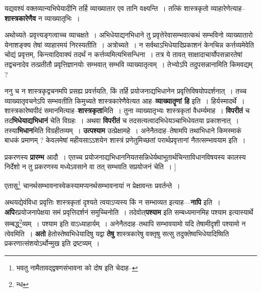 \documentclass[article,12pt,a4paper]{memoir}
\begin{document}
	  \pstart यद्यवश्यं वक्तव्यान्यभिघेयादीनि तर्हि व्याख्यातार एव तानि वक्ष्यन्ति । तत्किं शास्त्रकृतो व्याहारेणेत्याह--\textbf{शास्त्रकारेणैव} न व्याख्यातृभिः ।
	\pend
      

	  \pstart अथोच्यते--प्रवृत्त्यङ्गत्वाच्च व्याचक्षते । अभिधेयाद्यनभिधाने तु प्रवृत्तेरेवासम्भवात्कथं सम्भविनो व्याख्यातारो येनाशङ्क्य तेषां व्याहारमयं निरस्यतीति । अत्रोच्यते । न सर्वथाऽभिधेयादिप्रकाशनं केनचिन्न कर्त्तव्यमेवेति चोद्यं प्रवृत्तम्, किन्त्वादिवाक्यं तदर्थं न कर्त्तव्यमित्यभिसन्धिना । तत्र ये तावत् साक्षादाचार्योपसन्नारतेषां तद्वचनादेव तत्प्रतीतौ प्रवृत्तिज्ञानयोः सम्भवात् सम्भवि व्याख्यातृत्वम् । तेभ्योऽपि तदुपसन्नानामिति किमवद्यम् ?
	\pend
      

	  \pstart ननु च न शास्त्रकृद्वचनमपि प्रसह्य प्रवर्त्तयति, किं तर्हि प्रयोजनाद्यभिधानेन प्रवृत्तिविषयोपदर्शनात् । तच्च व्याख्यातृवचनेऽपि सम्भवतीति किमुच्यते शास्त्रकारेणैवेत्यत आह--\textbf{व्याख्यातॄणां हि} इति । हिर्यस्मादर्थे । शास्त्रकारेष्वपीदं समानमित्याह--\textbf{शास्त्रकृता}मिति । तुना व्याख्यातृभ्यः शास्त्रकृतां वैधर्म्यमाह । \textbf{विपरीतं} च तद\textbf{भिधेयाद्यभिधानं} चेति विग्रहः । अथवा \textbf{विपरीतं} च तदसत्यत्वादभिधेयञ्चाभिधेयतया प्रकाशनात् । तस्या\textbf{भिधान}मिति विग्रहीतव्यम् । \textbf{उत्पश्याम} उत्प्रेक्षामहे । अनेनैतदाह--तेषामपि तथाभिधाने किमस्माकं बाधकं प्रमाणम् ? केवलमेषां महीयसाऽऽशयेन शास्त्रं प्रणेतुमिच्छतां परार्थप्रवृत्तानां नैतत्सम्भावयाम इति ।
	\pend
      

	  \pstart प्रकरणस्य \textbf{प्रारम्भ} आदौ । एतच्च प्रयोजनाद्यभिधाननियतसन्निधेर्यथाभूतार्थचिन्ताविधानविषयस्य कालस्य निर्देशो न तु प्रकरणस्य \leavevmode{} मध्येऽवसाने वा तत् सम्भवति सप्रयोजनं चेति ।
	\pend
      [[उपायोऽस्ति प्रयो० C]]
	  \bigskip
	  \begingroup
	

	  \pstart एतासु\footnote{भवतु नामैतावद्द्वषणसंभावना को दोष इति चेदाह--\cite{dp-msD-n}} चानर्थसम्भावनास्वेकस्यामप्यनर्थसम्भावनायां न प्रेक्षावन्तः प्रवर्तन्ते ।
	\pend
      
	  \endgroup
	

	  \pstart अथयद्येवंविधा प्रवृत्तिः शास्त्रकृतां दृश्यते त्वयाऽप्यस्य किं न सम्भाव्यत इत्याह—\textbf{नापि} इति । \textbf{अपि}रप्रयोजनापेक्षया समं प्रवृत्तिदर्शनं समुच्चिनोति । तदेवोत्\textbf{पश्याम} इति सम्बध्यमानमिह पश्याम इत्यास्यार्थे सम्बद्ध\footnote{न्ध}\-व्यम् । पश्याम इति वाऽध्याहार्यम् । अनेनैतदाह--तथापि सम्भावयामो यदि तेषामीदृशी पश्यामो न त्वेवमिति । \textbf{अतो} हेतोस्तेष्वभिधेयादिषु यद्वा \textbf{तेषु} शास्त्रकारेषु वक्तृषु सत्सु तदुक्तेष्वभिधेयादिष्विति प्रकरणात्संशयोऽर्थोन्मुख इति द्रष्टव्यम् ।
	\pend
      
\end{document}
